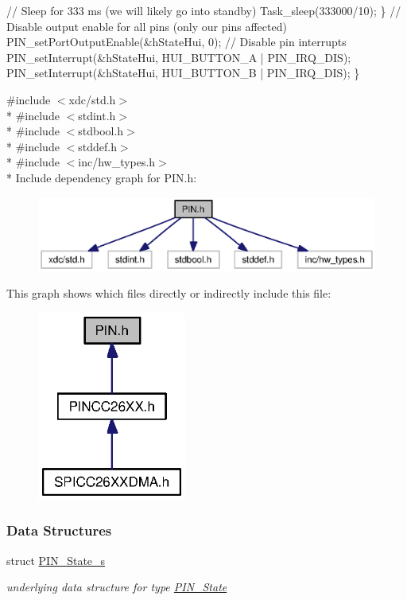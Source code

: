 \begin{DoxyCode}
        \textcolor{comment}{// Sleep for 333 ms (we will likely go into standby)}
        Task\_sleep(333000/10);
    \}
    \textcolor{comment}{// Disable output enable for all pins (only our pins affected)}
    PIN_setPortOutputEnable(&hStateHui, 0);
    \textcolor{comment}{// Disable pin interrupts}
    PIN_setInterrupt(&hStateHui, HUI\_BUTTON\_A | PIN_IRQ_DIS);
    PIN_setInterrupt(&hStateHui, HUI\_BUTTON\_B | PIN_IRQ_DIS);
\}
\end{DoxyCode}
 {\ttfamily \#include $<$xdc/std.\+h$>$}\\*
{\ttfamily \#include $<$stdint.\+h$>$}\\*
{\ttfamily \#include $<$stdbool.\+h$>$}\\*
{\ttfamily \#include $<$stddef.\+h$>$}\\*
{\ttfamily \#include $<$inc/hw\+\_\+types.\+h$>$}\\*
Include dependency graph for P\+I\+N.\+h\+:
\nopagebreak
\begin{figure}[H]
\begin{center}
\leavevmode
\includegraphics[width=350pt]{_p_i_n_8h__incl}
\end{center}
\end{figure}
This graph shows which files directly or indirectly include this file\+:
\nopagebreak
\begin{figure}[H]
\begin{center}
\leavevmode
\includegraphics[width=139pt]{_p_i_n_8h__dep__incl}
\end{center}
\end{figure}
\subsubsection*{Data Structures}
\begin{DoxyCompactItemize}
\item 
struct \hyperlink{struct_p_i_n___state__s}{P\+I\+N\+\_\+\+State\+\_\+s}
\begin{DoxyCompactList}\small\item\em underlying data structure for type \hyperlink{_p_i_n_8h_a36ef69d50df6baa6973482669c24a522}{P\+I\+N\+\_\+\+State} \end{DoxyCompactList}\end{DoxyCompactItemize}

